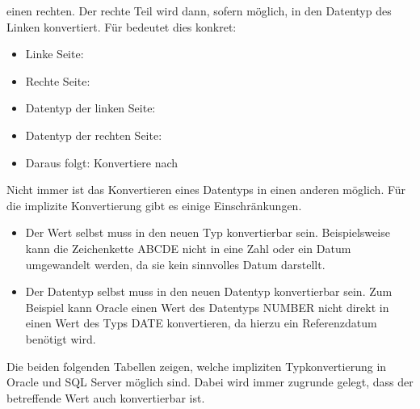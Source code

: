         einen rechten. Der rechte Teil wird dann, sofern m\"oglich, in den
        Datentyp des Linken konvertiert. F\"ur  bedeutet dies
        konkret:
        \begin{itemize}
          \item Linke Seite: 
          \item Rechte Seite: 
          \item Datentyp der linken Seite: 
          \item Datentyp der rechten Seite: 
          \item Daraus folgt: Konvertiere  nach 
        \end{itemize}
        Nicht immer ist das Konvertieren eines Datentyps in einen anderen m\"oglich. F\"ur die implizite Konvertierung gibt es einige Einschr\"ankungen.
        \begin{itemize}
          \item Der Wert selbst muss in den neuen Typ konvertierbar sein. Beispielsweise kann die Zeichenkette ABCDE nicht in eine Zahl oder ein Datum umgewandelt werden, da sie kein sinnvolles Datum darstellt.
          \item Der Datentyp selbst muss in den neuen Datentyp konvertierbar sein. Zum Beispiel kann Oracle einen Wert des Datentyps NUMBER nicht direkt in einen Wert des Typs DATE konvertieren, da hierzu ein Referenzdatum ben\"otigt wird.
        \end{itemize}
        Die beiden folgenden Tabellen zeigen, welche impliziten Typkonvertierung in Oracle und SQL Server m\"oglich sind. Dabei wird immer zugrunde gelegt, dass der betreffende Wert auch konvertierbar ist.
